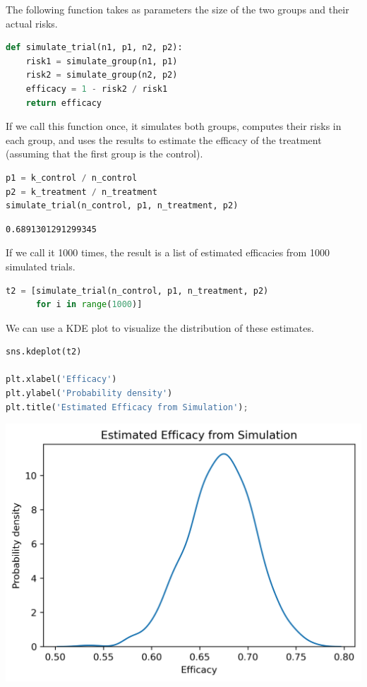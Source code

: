 The following function takes as parameters the size of the two groups
and their actual risks.

\begin{lstlisting}[language=Python,style=source]
def simulate_trial(n1, p1, n2, p2):
    risk1 = simulate_group(n1, p1)
    risk2 = simulate_group(n2, p2)
    efficacy = 1 - risk2 / risk1
    return efficacy
\end{lstlisting}

If we call this function once, it simulates both groups, computes their
risks in each group, and uses the results to estimate the efficacy of
the treatment (assuming that the first group is the control).

\begin{lstlisting}[language=Python,style=source]
p1 = k_control / n_control
p2 = k_treatment / n_treatment
simulate_trial(n_control, p1, n_treatment, p2)
\end{lstlisting}

\begin{lstlisting}[style=output]
0.6891301291299345
\end{lstlisting}

If we call it 1000 times, the result is a list of estimated efficacies
from 1000 simulated trials.

\begin{lstlisting}[language=Python,style=source]
t2 = [simulate_trial(n_control, p1, n_treatment, p2)
      for i in range(1000)]
\end{lstlisting}

We can use a KDE plot to visualize the distribution of these estimates.

\begin{lstlisting}[language=Python,style=source]
sns.kdeplot(t2)

plt.xlabel('Efficacy')
plt.ylabel('Probability density')
plt.title('Estimated Efficacy from Simulation');
\end{lstlisting}

\begin{center}
\includegraphics[scale=0.75]{11_resampling_files/11_resampling_45_0.png}
\end{center}

